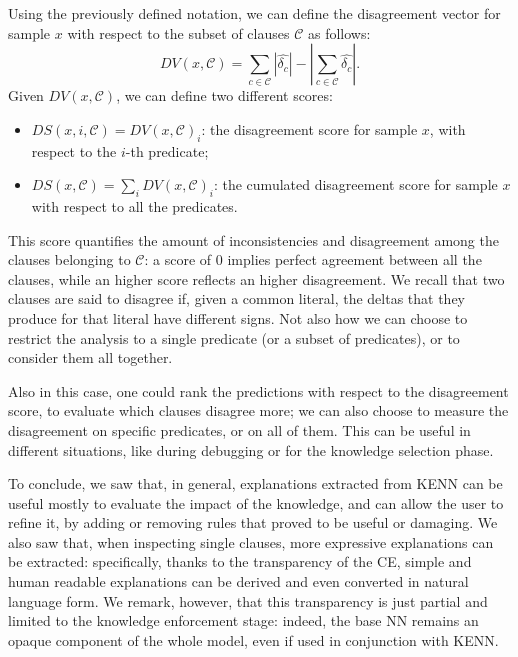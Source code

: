 \begin{definition}
	Using the previously defined notation, we can define the disagreement vector for sample $x$ with respect to the subset of clauses $\mathcal{C}$ as follows:
	\begin{equation}
DV(x, \mathcal{C}) = \sum_{c\in\mathcal{C}}\left|\hat{\delta_c}\right| - \left|\sum_{c\in\mathcal{C}}\hat{\delta_c} \right|.
	\end{equation}
Given $DV(x, \mathcal{C})$, we can define two different scores:
\begin{itemize}
	\item $DS(x,i,\mathcal{C}) = DV(x, \mathcal{C})_i$: the disagreement score for sample $x$, with respect to the $i$-th predicate;
	\item $DS(x,\mathcal{C}) = \sum_i DV(x, \mathcal{C})_i$: the cumulated disagreement score for sample $x$ with respect to all the predicates. 
\end{itemize}
This score quantifies the amount of inconsistencies and disagreement among the clauses belonging to $\mathcal{C}$: a score of $0$ implies perfect agreement between all the clauses, while an higher score reflects an higher disagreement. We recall that two clauses are said to disagree if, given a common literal, the deltas that they produce for that literal have different signs. Not also how we can choose to restrict the analysis to a single predicate (or a subset of predicates), or to consider them all together.
\end{definition}

Also in this case, one could rank the predictions with respect to the disagreement score, to evaluate which clauses disagree more; we can also choose to measure the disagreement on specific predicates, or on all of them. This can be useful in different situations, like during debugging or for the knowledge selection phase.

To conclude, we saw that, in general, explanations extracted from KENN can be useful mostly to evaluate the impact of the knowledge, and can allow the user to refine it, by adding or removing rules that proved to be useful or damaging. We also saw that, when inspecting single clauses, more expressive explanations can be extracted: specifically, thanks to the transparency of the CE, simple and human readable explanations can be derived and even converted in natural language form. We remark, however, that this transparency is just partial and limited to the knowledge enforcement stage: indeed, the base NN remains an opaque component of the whole model, even if used in conjunction with KENN.
 



